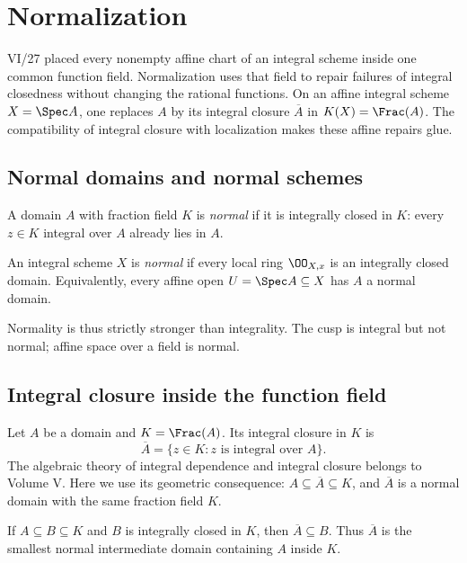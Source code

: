\chapter{Normalization}\label{ch:vi28-normalization}

VI/27 placed every nonempty affine chart of an integral scheme inside one common function field.  Normalization
uses that field to repair failures of integral closedness without changing the rational functions.  On an affine
integral scheme $X=\Spec A$, one replaces $A$ by its integral closure $\overline A$ in $K(X)=\Frac(A)$.  The
compatibility of integral closure with localization makes these affine repairs glue.

\section{Normal domains and normal schemes}
\begin{definition}\label{def:vi28-normal-domain}
A domain $A$ with fraction field $K$ is \emph{normal} if it is integrally closed in $K$: every $z\in K$ integral
over $A$ already lies in $A$.
\end{definition}

\begin{definition}\label{def:vi28-normal-scheme}
An integral scheme $X$ is \emph{normal} if every local ring $\OO_{X,x}$ is an integrally closed domain.
Equivalently, every affine open $U=\Spec A\subseteq X$ has $A$ a normal domain.
\end{definition}

Normality is thus strictly stronger than integrality.  The cusp is integral but not normal; affine space over a
field is normal.



\section{Integral closure inside the function field}
Let $A$ be a domain and $K=\Frac(A)$.  Its integral closure in $K$ is
\[
\overline A=\{z\in K: z\text{ is integral over }A\}.
\]
The algebraic theory of integral dependence and integral closure belongs to Volume V.  Here we use its geometric
consequence: $A\subseteq\overline A\subseteq K$, and $\overline A$ is a normal domain with the same fraction field
$K$.

\begin{proposition}\label{prop:vi28-minimal-normal}
If $A\subseteq B\subseteq K$ and $B$ is integrally closed in $K$, then $\overline A\subseteq B$.  Thus
$\overline A$ is the smallest normal intermediate domain containing $A$ inside $K$.
\end{proposition}

